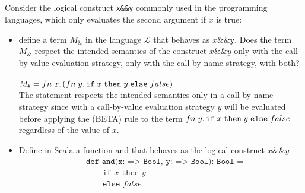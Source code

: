 \subsection{}

Consider the logical construct \texttt{x\&\&y} commonly used in the programming
languages, which only evaluates the second argument if $x$ is true:
\begin{itemize}
	\item define a term $M_\texttt{\&}$ in the language $\mathcal{L}$ that
	      behaves as $x\texttt{\&\&y}$. Does the term $M_\texttt{\&}$ respect
	      the intended semantics of the construct $x\texttt{\&\&}y$ only with
	      the call-by-value evaluation strategy, only with the call-by-name
	      strategy, with both?\\~\\
	      $M_\texttt{\&} = fn\;x.\,(fn\;y.\,\texttt{if}\;x\;\texttt{then}\;y\;\texttt{else}\;false)$\\
	      The statement respects  the intended semantics only in a call-by-name
	      strategy since with a call-by-value evaluation strategy $y$ will be
	      evaluated before applying the (BETA) rule to the term
	      $fn\;y.\,\texttt{if}\;x\;\texttt{then}\;y\;\texttt{else}\;false$ regardless of the value of $x$.
	\item Define in Scala a function and that behaves as the logical construct
	      $x\texttt{\&\&}y$
	      \begin{align*}
		       & \texttt{def and(x: => Bool, y: => Bool): Bool =} \\
		       & \qquad\texttt{if }x\texttt{ then }y              \\
		       & \qquad\texttt{else }false
	      \end{align*}
\end{itemize}
